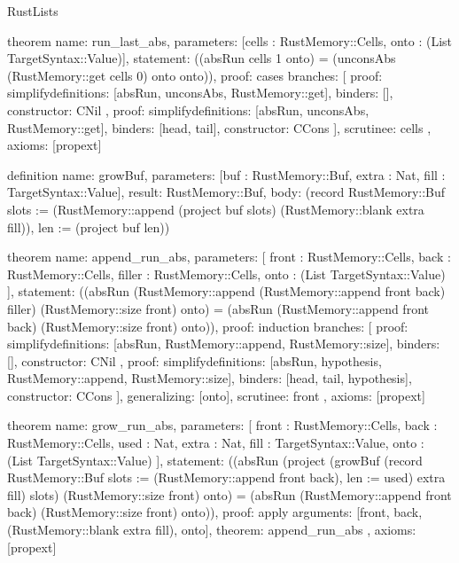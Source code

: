 \begin{lexlean}{RustLists}
\begin{semanticmodule}
theorem{
  name: run_last_abs,
  parameters: [cells : RustMemory::Cells, onto : (List TargetSyntax::Value)],
  statement: ((absRun cells 1 onto) = (unconsAbs (RustMemory::get cells 0) onto onto)),
  proof: cases{
    branches: [
      {
        proof: simplify{definitions: [absRun, unconsAbs, RustMemory::get]},
        binders: [],
        constructor: CNil
      },
      {
        proof: simplify{definitions: [absRun, unconsAbs, RustMemory::get]},
        binders: [head, tail],
        constructor: CCons
      }
    ],
    scrutinee: cells
  },
  axioms: [propext]
}

definition{
  name: growBuf,
  parameters: [buf : RustMemory::Buf, extra : Nat, fill : TargetSyntax::Value],
  result: RustMemory::Buf,
  body: (record RustMemory::Buf {slots := (RustMemory::append (project buf slots) (RustMemory::blank extra fill)), len := (project buf len)})
}

theorem{
  name: append_run_abs,
  parameters: [
    front : RustMemory::Cells,
    back : RustMemory::Cells,
    filler : RustMemory::Cells,
    onto : (List TargetSyntax::Value)
  ],
  statement: ((absRun (RustMemory::append (RustMemory::append front back) filler) (RustMemory::size front) onto) = (absRun (RustMemory::append front back) (RustMemory::size front) onto)),
  proof: induction{
    branches: [
      {
        proof: simplify{definitions: [absRun, RustMemory::append, RustMemory::size]},
        binders: [],
        constructor: CNil
      },
      {
        proof: simplify{definitions: [absRun, hypothesis, RustMemory::append, RustMemory::size]},
        binders: [head, tail, hypothesis],
        constructor: CCons
      }
    ],
    generalizing: [onto],
    scrutinee: front
  },
  axioms: [propext]
}

theorem{
  name: grow_run_abs,
  parameters: [
    front : RustMemory::Cells,
    back : RustMemory::Cells,
    used : Nat,
    extra : Nat,
    fill : TargetSyntax::Value,
    onto : (List TargetSyntax::Value)
  ],
  statement: ((absRun (project (growBuf (record RustMemory::Buf {slots := (RustMemory::append front back), len := used}) extra fill) slots) (RustMemory::size front) onto) = (absRun (RustMemory::append front back) (RustMemory::size front) onto)),
  proof: apply{
    arguments: [front, back, (RustMemory::blank extra fill), onto],
    theorem: append_run_abs
  },
  axioms: [propext]
}


\end{semanticmodule}
\end{lexlean}
